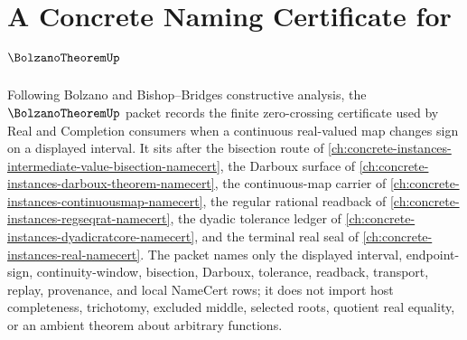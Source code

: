 \chapter{A Concrete Naming Certificate for $\BolzanoTheoremUp$}
\label{ch:concrete-instances-bolzano-theorem-namecert}

Following Bolzano and Bishop--Bridges constructive analysis, the $\BolzanoTheoremUp$ packet records the finite zero-crossing certificate used by Real and Completion consumers when a continuous real-valued map changes sign on a displayed interval. It sits after the bisection route of \autoref{ch:concrete-instances-intermediate-value-bisection-namecert}, the Darboux surface of \autoref{ch:concrete-instances-darboux-theorem-namecert}, the continuous-map carrier of \autoref{ch:concrete-instances-continuousmap-namecert}, the regular rational readback of \autoref{ch:concrete-instances-regseqrat-namecert}, the dyadic tolerance ledger of \autoref{ch:concrete-instances-dyadicratcore-namecert}, and the terminal real seal of \autoref{ch:concrete-instances-real-namecert}. The packet names only the displayed interval, endpoint-sign, continuity-window, bisection, Darboux, tolerance, readback, transport, replay, provenance, and local NameCert rows; it does not import host completeness, trichotomy, excluded middle, selected roots, quotient real equality, or an ambient theorem about arbitrary functions.

